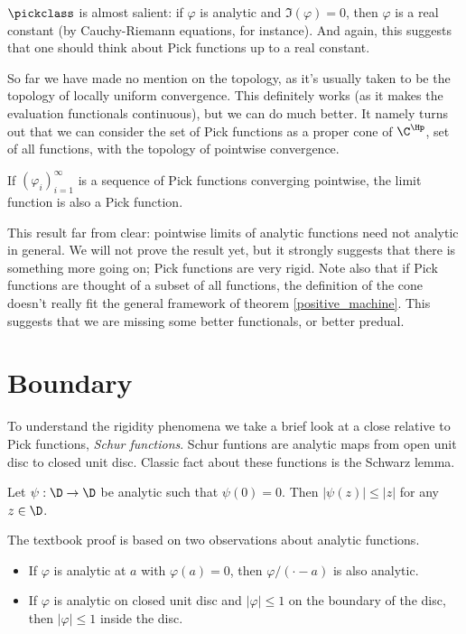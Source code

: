 $\pickclass$ is almost salient: if $\varphi$ is analytic and $\Im(\varphi) = 0$, then $\varphi$ is a real constant (by Cauchy-Riemann equations, for instance). And again, this suggests that one should think about Pick functions up to a real constant.

So far we have made no mention on the topology, as it's usually taken to be the topology of locally uniform convergence. This definitely works (as it makes the evaluation functionals continuous), but we can do much better. It namely turns out that we can consider the set of Pick functions as a proper cone of $\C^{\Hp}$, set of all functions, with the topology of pointwise convergence.

\begin{prop}\label{pick_convergence}
	If $(\varphi_{i})_{i = 1}^{\infty}$ is a sequence of Pick functions converging pointwise, the limit function is also a Pick function.
\end{prop}

This result far from clear: pointwise limits of analytic functions need not analytic in general. We will not prove the result yet, but it strongly suggests that there is something more going on; Pick functions are very rigid. Note also that if Pick functions are thought of a subset of all functions, the definition of the cone doesn't really fit the general framework of theorem \ref{positive_machine}. This suggests that we are missing some better functionals, or better predual.

\section{Boundary}

To understand the rigidity phenomena we take a brief look at a close relative to Pick functions, \textit{Schur functions}. Schur funtions are analytic maps from open unit disc to closed unit disc. Classic fact about these functions is the Schwarz lemma.

\begin{lause}
	Let $\psi : \D \to \D$ be analytic such that $\psi(0) = 0$. Then $|\psi(z)| \leq |z|$ for any $z \in \D$.
\end{lause}

The textbook proof is based on two observations about analytic functions.
\begin{itemize}
	\item If $\varphi$ is analytic at $a$ with $\varphi(a) = 0$, then $\varphi/(\cdot - a)$ is also analytic.
	\item If $\varphi$ is analytic on closed unit disc and $|\varphi| \leq 1$ on the boundary of the disc, then $|\varphi| \leq 1$ inside the disc.
\end{itemize}

